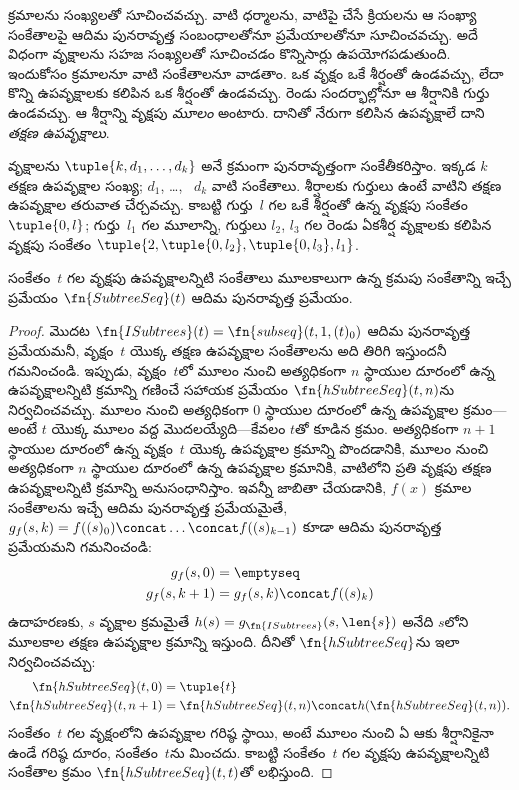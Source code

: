 \documentclass[../../../include/open-logic-section]{subfiles}
\begin{document}

క్రమాలను సంఖ్యలతో సూచించవచ్చు. వాటి ధర్మాలను, వాటిపై చేసే క్రియలను
ఆ సంఖ్యా సంకేతాలపై ఆదిమ పునరావృత్త సంబంధాలతోనూ ప్రమేయాలతోనూ సూచించవచ్చు.
అదే విధంగా వృక్షాలను సహజ సంఖ్యలతో సూచించడం కొన్నిసార్లు ఉపయోగపడుతుంది.
ఇందుకోసం క్రమాలనూ వాటి సంకేతాలనూ వాడతాం. ఒక వృక్షం ఒకే శీర్షంతో ఉండవచ్చు,
లేదా కొన్ని ఉపవృక్షాలకు కలిపిన ఒక శీర్షంతో ఉండవచ్చు. రెండు సందర్భాల్లోనూ
ఆ శీర్షానికి గుర్తు ఉండవచ్చు. ఆ శీర్షాన్ని వృక్షపు \emph{మూలం} అంటారు.
దానితో నేరుగా కలిసిన ఉపవృక్షాలే దాని \emph{తక్షణ ఉపవృక్షాలు}.

వృక్షాలను $\tuple{k,d_1,\dots,d_k}$ అనే క్రమంగా పునరావృత్తంగా
సంకేతీకరిస్తాం. ఇక్కడ $k$ తక్షణ ఉపవృక్షాల సంఖ్య; $d_1$, \dots,
~$d_k$ వాటి సంకేతాలు. శీర్షాలకు గుర్తులు ఉంటే వాటిని తక్షణ
ఉపవృక్షాల తరువాత చేర్చవచ్చు. కాబట్టి గుర్తు~$l$ గల ఒకే శీర్షంతో
ఉన్న వృక్షపు సంకేతం $\tuple{0,l}$; గుర్తు~$l_1$ గల మూలాన్ని,
గుర్తులు $l_2$, $l_3$ గల రెండు ఏకశీర్ష వృక్షాలకు కలిపిన వృక్షపు
సంకేతం $\tuple{2,\tuple{0,l_2},\tuple{0,l_3},l_1}$.

\begin{prop}
  సంకేతం~$t$ గల వృక్షపు ఉపవృక్షాలన్నిటి సంకేతాలు మూలకాలుగా ఉన్న
  క్రమపు సంకేతాన్ని ఇచ్చే ప్రమేయం $\fn{SubtreeSeq}(t)$ ఆదిమ
  పునరావృత్త ప్రమేయం.
\end{prop}

\begin{proof}
  మొదట $\fn{ISubtrees}(t)=\fn{subseq}(t,1,(t)_0)$ ఆదిమ పునరావృత్త
  ప్రమేయమనీ, వృక్షం~$t$ యొక్క తక్షణ ఉపవృక్షాల సంకేతాలను అది తిరిగి
  ఇస్తుందనీ గమనించండి. ఇప్పుడు, వృక్షం~$t$లో మూలం నుంచి అత్యధికంగా
  $n$ స్థాయుల
  దూరంలో ఉన్న ఉపవృక్షాలన్నిటి క్రమాన్ని గణించే సహాయక ప్రమేయం
  $\fn{hSubtreeSeq}(t,n)$ను నిర్వచించవచ్చు. మూలం నుంచి అత్యధికంగా
  $0$ స్థాయుల దూరంలో ఉన్న ఉపవృక్షాల క్రమం---అంటే $t$ యొక్క మూలం
  వద్ద మొదలయ్యేది---కేవలం $t$తో కూడిన క్రమం. అత్యధికంగా $n+1$
  స్థాయుల దూరంలో ఉన్న వృక్షం~$t$ యొక్క ఉపవృక్షాల క్రమాన్ని పొందడానికి,
  మూలం నుంచి అత్యధికంగా $n$ స్థాయుల దూరంలో ఉన్న ఉపవృక్షాల క్రమానికి,
  వాటిలోని ప్రతి వృక్షపు
  తక్షణ ఉపవృక్షాలన్నిటి క్రమాన్ని అనుసంధానిస్తాం.
  ఇవన్నీ జాబితా చేయడానికి, $f(x)$ క్రమాల సంకేతాలను ఇచ్చే
  ఆదిమ పునరావృత్త ప్రమేయమైతే,
  $g_f(s,k)=f((s)_0)\concat\dots\concat f((s)_{k-1})$ కూడా ఆదిమ
  పునరావృత్త ప్రమేయమని గమనించండి:
    \begin{align*}
      g_f(s, 0) & = \emptyseq\\
      g_f(s, k+1) & = g_f(s, k) \concat f((s)_k)
    \end{align*}
    ఉదాహరణకు, $s$ వృక్షాల క్రమమైతే
    $h(s)=g_{\fn{ISubtrees}}(s,\len{s})$ అనేది $s$లోని మూలకాల
    తక్షణ ఉపవృక్షాల క్రమాన్ని ఇస్తుంది.
    దీనితో $\fn{hSubtreeSeq}$ను ఇలా నిర్వచించవచ్చు:
    \begin{align*}
      \fn{hSubtreeSeq}(t, 0) & = \tuple{t} \\
      \fn{hSubtreeSeq}(t, n+1) & = \fn{hSubtreeSeq}(t, n) \concat
      h(\fn{hSubtreeSeq}(t, n)).
    \end{align*}
    సంకేతం~$t$ గల వృక్షంలోని ఉపవృక్షాల గరిష్ఠ స్థాయి, అంటే మూలం నుంచి
    ఏ ఆకు శీర్షానికైనా ఉండే గరిష్ఠ దూరం, సంకేతం~$t$ను మించదు.
    కాబట్టి సంకేతం~$t$ గల వృక్షపు ఉపవృక్షాలన్నిటి సంకేతాల క్రమం
    $\fn{hSubtreeSeq}(t,t)$తో లభిస్తుంది.
\end{proof}
\end{document}
